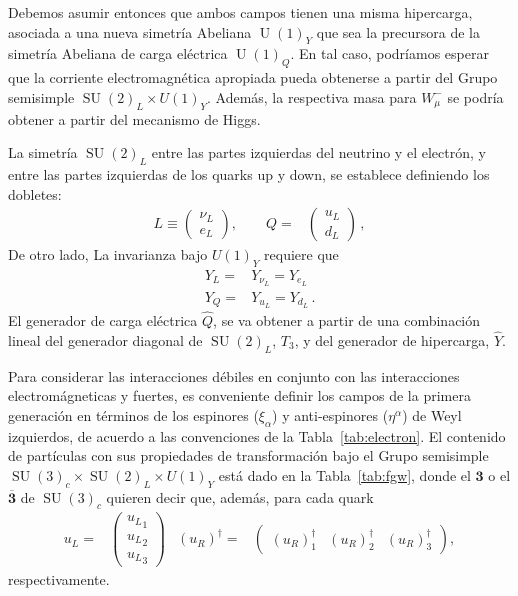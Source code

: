 \begin{frame}
Debemos asumir entonces que ambos campos tienen una misma hipercarga,
asociada a una nueva simetría Abeliana $\operatorname{U}(1)_Y$ que sea la precursora de la simetría Abeliana de carga eléctrica $\operatorname{U}(1)_Q$. En tal caso, podríamos esperar que
la corriente electromagnética apropiada pueda obtenerse a partir del
Grupo semisimple $\operatorname{SU}(2)_L\times U(1)_Y$. Además, la respectiva masa para $W_{\mu}^{-}$
se podría obtener a partir del mecanismo de Higgs.

La simetría $\operatorname{SU}(2)_L$ entre las partes izquierdas del neutrino y el electrón, y entre las partes izquierdas de los quarks up y down, se establece  definiendo los dobletes:
  \begin{align}
    L\equiv\begin{pmatrix}
      \nu_L\\
      e_L      
    \end{pmatrix},\qquad   Q=&\begin{pmatrix}
    u_L\\
    d_L
  \end{pmatrix}\,,
  \end{align}
De otro lado, La invarianza bajo $U(1)_Y$ requiere que
\begin{align}
  Y_L=&Y_{\nu_L}=Y_{e_L}\nonumber\\
  Y_Q=&Y_{u_L}=Y_{d_L}\,.
\end{align}
El generador de carga eléctrica $\widehat{Q}$, se va obtener a partir de una combinación lineal del generador diagonal de $\operatorname{SU}(2)_L$, $T_3$, y del generador de hipercarga, $\widehat{Y}$.

Para considerar las interacciones débiles en conjunto con las interacciones electromágneticas y fuertes, es conveniente definir los campos de la primera generación en términos de los espinores ($\xi_{\alpha}$) y anti-espinores ($\eta^{\alpha}$) de Weyl izquierdos, de acuerdo a las convenciones de la Tabla~\ref{tab:electron}. El contenido de partículas con sus propiedades de transformación bajo el Grupo semisimple $\operatorname{SU}(3)_c\times \operatorname{SU}(2)_L\times U(1)_Y$ está dado en la Tabla~\ref{tab:fgw}, donde el $\mathbf{3}$ o el $\overline{\mathbf{3}}$ de $\operatorname{SU}(3)_c$ quieren decir que, además, para cada quark
\begin{align}
u_L=&
\begin{pmatrix}
  {u_{L}}_1\\
  {u_{L}}_2\\
  {u_{L}}_3
\end{pmatrix}&
  \left( u_R \right)^{\dagger}=&
  \begin{pmatrix}
    \left( u_R \right)^{\dagger}_1&
        \left( u_R \right)^{\dagger}_2&    \left( u_R \right)^{\dagger}_3
  \end{pmatrix},
\end{align}
respectivamente.




\end{frame}
